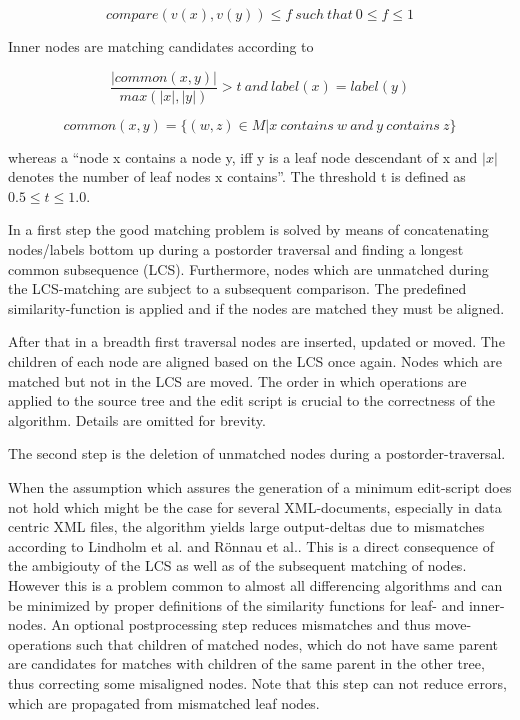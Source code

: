 \begin{equation} 
compare(v(x), v(y)) \leq f\ such\ that\ 0 \leq f \leq 1
\end{equation}

Inner nodes are matching candidates according to

\begin{equation}
\frac{|common(x, y)|}{max(|x|,|y|)} > t\ and\ label(x) = label(y)
\end{equation}

\begin{equation}
common(x,y) = \{(w,z) \in M | x\ contains\ w\ and\ y\ contains\ z\}
\end{equation}

whereas a ``node x contains a node y, iff y is a leaf node descendant of x and $|x|$ denotes the number of leaf nodes x contains''. The threshold t is defined as $0.5 \leq t \leq 1.0$.

In a first step the good matching problem is solved by means of concatenating nodes/labels bottom up during a postorder traversal and finding a longest common subsequence (LCS). Furthermore, nodes which are unmatched during the LCS-matching are subject to a subsequent comparison. The predefined similarity-function is applied and if the nodes are matched they must be aligned. 

After that in a breadth first traversal nodes are inserted, updated or moved. The children of each node are aligned based on the LCS once again. Nodes which are matched but not in the LCS are moved. The order in which operations are applied to the source tree and the edit script is crucial to the correctness of the algorithm. Details are omitted for brevity.

The second step is the deletion of unmatched nodes during a postorder-traversal.

When the assumption which assures the generation of a minimum edit-script does not hold which might be the case for several XML-documents, especially in data centric XML files, the algorithm yields large output-deltas due to mismatches according to Lindholm et al.\cite{lindholm2006fast} and Rönnau et al.\cite{ronnau2009efficient}. This is a direct consequence of the ambigiouty of the LCS as well as of the subsequent matching of nodes. However this is a problem common to almost all differencing algorithms and can be minimized by proper definitions of the similarity functions for leaf- and inner-nodes. An optional postprocessing step reduces mismatches and thus move-operations such that children of matched nodes, which do not have same parent are candidates for matches with children of the same parent in the other tree, thus correcting some misaligned nodes. Note that this step can not reduce errors, which are propagated from mismatched leaf nodes.

